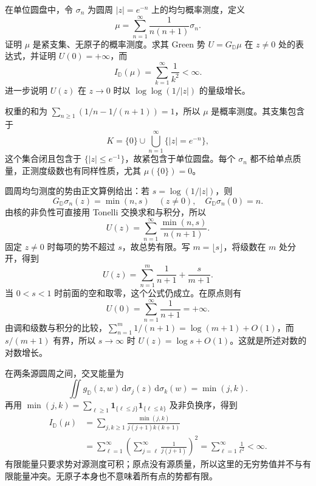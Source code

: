 \begin{exercise}[无原子且有限能量的势仍可在单点无穷]\label{b3:ex:17-draft-03}
在单位圆盘中，令 \(\sigma_n\) 为圆周 \(|z|=e^{-n}\) 上的均匀概率测度，定义
\[
 \mu=\sum_{n=1}^\infty\frac1{n(n+1)}\sigma_n.
\]
证明 \(\mu\) 是紧支集、无原子的概率测度。求其 Green 势 \(U=G_{\mathbb D}\mu\) 在 \(z\ne0\) 处的表达式，并证明 \(U(0)=+\infty\)，而
\[
 I_{\mathbb D}(\mu)=\sum_{k=1}^\infty\frac1{k^2}<\infty.
\]
进一步说明 \(U(z)\) 在 \(z\to0\) 时以 \(\log\log(1/|z|)\) 的量级增长。
\end{exercise}
\begin{solution}
权重的和为 \(\sum_{n\ge1}(1/n-1/(n+1))=1\)，所以 \(\mu\) 是概率测度。其支集包含于
\[
 K=\{0\}\cup\bigcup_{n=1}^\infty\{|z|=e^{-n}\},
\]
这个集合闭且包含于 \(\{|z|\le e^{-1}\}\)，故紧包含于单位圆盘。每个 \(\sigma_n\) 都不给单点质量，正测度级数也有同样性质，尤其 \(\mu(\{0\})=0\)。

圆周均匀测度的势由正文算例给出：若 \(s=\log(1/|z|)\)，则
\[
 G_{\mathbb D}\sigma_n(z)=\min(n,s)\quad(z\ne0),
 \quad G_{\mathbb D}\sigma_n(0)=n.
\]
由核的非负性可直接用 Tonelli 交换求和与积分，所以
\[
 U(z)=\sum_{n=1}^\infty\frac{\min(n,s)}{n(n+1)}.
\]
固定 \(z\ne0\) 时每项的势不超过 \(s\)，故总势有限。写 \(m=\lfloor s\rfloor\)，将级数在 \(m\) 处分开，得到
\[
 U(z)=\sum_{n=1}^m\frac1{n+1}+\frac{s}{m+1}.
\]
当 \(0<s<1\) 时前面的空和取零，这个公式仍成立。在原点则有
\[
 U(0)=\sum_{n=1}^\infty\frac1{n+1}=+\infty.
\]
由调和级数与积分的比较，\(\sum_{n=1}^m1/(n+1)=\log(m+1)+O(1)\)，而 \(s/(m+1)\) 有界，所以 \(s\to\infty\) 时 \(U(z)=\log s+O(1)\)。这就是所述对数的对数增长。

在两条源圆周之间，交叉能量为
\[
 \iint g_{\mathbb D}(z,w)\,\mathrm d\sigma_j(z)\,\mathrm d\sigma_k(w)
 =\min(j,k).
\]
再用 \(\min(j,k)=\sum_{\ell\ge1}\mathbf1_{\{\ell\le j\}}\mathbf1_{\{\ell\le k\}}\) 及非负换序，得到
\begin{align*}
 I_{\mathbb D}(\mu)
 &=\sum_{j,k\ge1}\frac{\min(j,k)}{j(j+1)k(k+1)}\\
 &=\sum_{\ell=1}^\infty
      \left(\sum_{j=\ell}^\infty\frac1{j(j+1)}\right)^2
 =\sum_{\ell=1}^\infty\frac1{\ell^2}<\infty.
\end{align*}
有限能量只要求势对源测度可积；原点没有源质量，所以这里的无穷势值并不与有限能量冲突。无原子本身也不意味着所有点的势都有限。
\end{solution}

